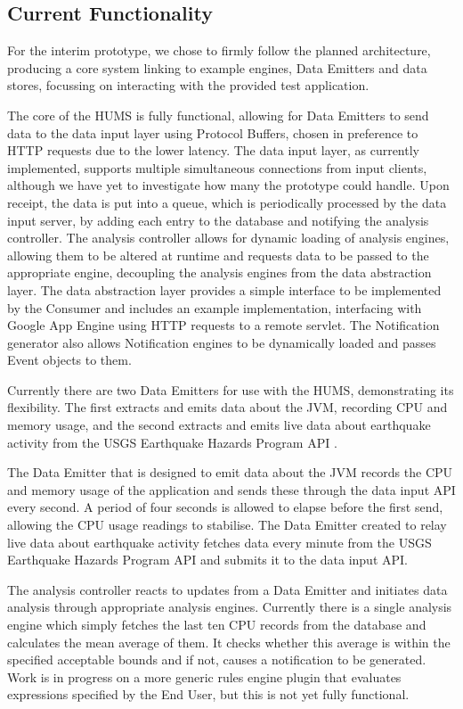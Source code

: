\documentclass[10pt,a4paper]{article}
\begin{document}
\subsection{Current Functionality}
For the interim prototype, we chose to firmly follow the planned architecture, producing a core system linking to example engines, Data Emitters and data stores, focussing on interacting with the provided test application.

The core of the HUMS is fully functional, allowing for Data Emitters to send data to the data input layer using Protocol Buffers, chosen in preference to HTTP requests due to the lower latency. The data input layer, as currently 
implemented, supports multiple simultaneous connections from input clients, although we have yet to investigate how many the prototype could handle. Upon receipt, the data is put into a queue, which is periodically processed by the data input server, by adding each entry to the database and notifying the analysis controller. The analysis controller allows for dynamic loading of analysis engines, allowing them to be altered at runtime and requests data to be passed to the appropriate engine, decoupling the analysis engines from the data abstraction layer. The data abstraction layer provides a simple interface to be implemented by the Consumer and includes an example implementation, interfacing with Google App Engine using HTTP requests to a remote servlet. The Notification generator also allows Notification engines to be dynamically loaded and passes Event objects to them.

Currently there are two Data Emitters for use with the HUMS, demonstrating its flexibility. The first extracts and emits data about the JVM, recording CPU and memory usage, and the second extracts and emits live data about earthquake activity from the USGS Earthquake Hazards Program API \cite{usgs}.

The Data Emitter that is designed to emit data about the JVM records the CPU and memory usage of the application and sends these through the data input API every second. A period of four seconds is allowed to elapse before the first send, allowing the CPU usage readings to stabilise. The Data Emitter created to relay live data about earthquake activity fetches data every minute from the USGS Earthquake Hazards Program API and submits it to the data input API.

The analysis controller reacts to updates from a Data Emitter and initiates
data analysis through appropriate analysis engines. Currently
there is a single analysis engine which simply fetches the last ten CPU records from the database and calculates the mean average of them. It checks whether this average is within the specified acceptable bounds and if not, causes a notification to be generated. Work is in progress on a more generic rules engine plugin that evaluates expressions specified by the End User, but this is not yet fully functional.
\end{document}
